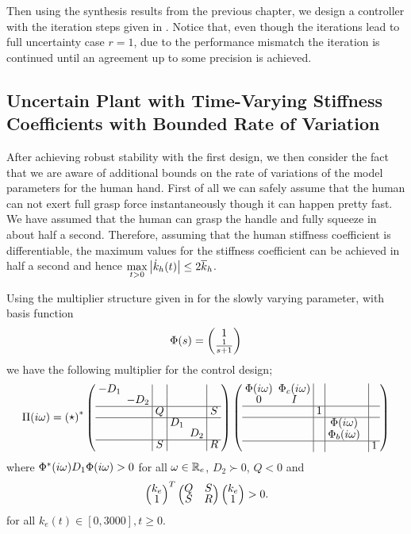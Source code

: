 \let\designdataone\empty


Then using the synthesis results from the previous chapter, we design a controller with the iteration steps given in 
. Notice that, even though the iterations lead to full uncertainty case $r=1$, due to the performance 
mismatch the iteration is continued until an agreement up to some precision is achieved. 

\subsection{Uncertain Plant with Time-Varying Stiffness Coefficients with Bounded Rate of Variation}

After achieving robust stability with the first design, we then consider the fact that we are aware of additional bounds on 
the rate of variations of the model parameters for the human hand. First of all we can safely assume that the human can not 
exert full grasp force instantaneously though it can happen pretty fast. We have assumed that the human can grasp the handle 
and fully squeeze in about half a second. Therefore, assuming that the human stiffness coefficient is differentiable, the 
maximum values for the stiffness coefficient can be achieved in half a second and hence ${\displaystyle\max_{t>0}}\displaystyle \left|\dot{k}_h(t)\right|\leq 
2\overline{k}_h$. 

Using the multiplier structure given in  for the slowly varying parameter, with basis function 
\[
\Phi(s) = \pmatr{1\\\frac{1}{s+1}}
\]
we have the following multiplier for the control design;
\[\renewcommand*{\arraystretch}{0.8}
\setlength{\arraycolsep}{.5\arraycolsep}
\Pi(\iw) = \pmatr{\star}^*\left(
\begin{array}{cc|c|cc|c}
	-D_1 & & &&&\\
    &-D_2&&&&\\\hline
    &&Q&&&S\\\hline
    &&&D_1&&\\
    &&&&D_2&\\\hline
    &&S&&&R
\end{array}
\right)
\left(\begin{array}{cc|c|cc|c}
	\Phi(\iw) &\Phi_c(\iw)&&&\\
    0&I&&&&\\\hline
    &&1&&&\\\hline
    &&&\Phi(\iw)&&\\
    &&&\Phi_b(\iw)&&\\\hline
    &&&&&1
    \end{array}
    \right)
\]
where $\Phi^*(i\omega)D_1\Phi(i\omega)> 0$ for all $\omega\in\mathbb{R}_e$, $D_2\succ 0$, $Q<0$ and 
\[
\pmatr{k_e\\1}^T\pmatr{Q &S\\S&R}\pmatr{k_e\\1}>0.
\] 
for all $k_e(t)\in[0,3000],t\geq 0$. 


